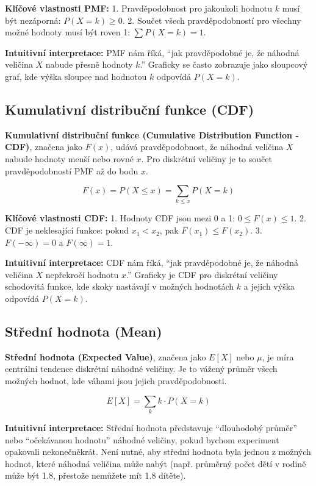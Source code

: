 \documentclass[
  czech,
  11pt,
  letterpaper,
  DIV=11,
  numbers=noendperiod]{scrreprt}
\begin{document}
\textbf{Klíčové vlastnosti PMF:} 1. Pravděpodobnost pro jakoukoli
hodnotu \(k\) musí být nezáporná: \(P(X=k) \geq 0\). 2. Součet všech
pravděpodobností pro všechny možné hodnoty musí být roven 1:
\(\sum P(X=k) = 1\).

\textbf{Intuitivní interpretace:} PMF nám říká, ``jak pravděpodobné je,
že náhodná veličina \(X\) nabude přesně hodnoty \(k\).'' Graficky se
často zobrazuje jako sloupcový graf, kde výška sloupce nad hodnotou
\(k\) odpovídá \(P(X=k)\).

\subsection{Kumulativní distribuční funkce
(CDF)}\label{kumulativnuxed-distribuux10dnuxed-funkce-cdf}

{\textbf{Kumulativní distribuční funkce (Cumulative Distribution
Function - CDF)}}, značena jako \(F(x)\), udává pravděpodobnost, že
náhodná veličina \(X\) nabude hodnoty menší nebo rovné \(x\). Pro
diskrétní veličiny je to součet pravděpodobností PMF až do bodu \(x\).

\[ F(x) = P(X \le x) = \sum_{k \le x} P(X=k) \]

\textbf{Klíčové vlastnosti CDF:} 1. Hodnoty CDF jsou mezi 0 a 1:
\(0 \le F(x) \le 1\). 2. CDF je neklesající funkce: pokud \(x_1 < x_2\),
pak \(F(x_1) \le F(x_2)\). 3. \(F(-\infty) = 0\) a \(F(\infty) = 1\).

\textbf{Intuitivní interpretace:} CDF nám říká, ``jak pravděpodobné je,
že náhodná veličina \(X\) nepřekročí hodnotu \(x\).'' Graficky je CDF
pro diskrétní veličiny schodovitá funkce, kde skoky nastávají v možných
hodnotách \(k\) a jejich výška odpovídá \(P(X=k)\).

\subsection{Střední hodnota (Mean)}\label{stux159ednuxed-hodnota-mean}

{\textbf{Střední hodnota (Expected Value)}}, značena jako \(E[X]\) nebo
\(\mu\), je míra centrální tendence diskrétní náhodné veličiny. Je to
vážený průměr všech možných hodnot, kde váhami jsou jejich
pravděpodobnosti.

\[ E[X] = \sum_{k} k \cdot P(X=k) \]

\textbf{Intuitivní interpretace:} Střední hodnota představuje
``dlouhodobý průměr'' nebo ``očekávanou hodnotu'' náhodné veličiny,
pokud bychom experiment opakovali nekonečněkrát. Není nutné, aby střední
hodnota byla jednou z možných hodnot, které náhodná veličina může nabýt
(např. průměrný počet dětí v rodině může být 1.8, přestože nemůžete mít
1.8 dítěte).
\end{document}
